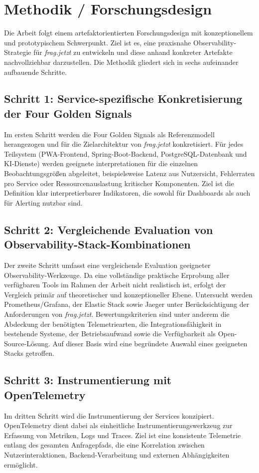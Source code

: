 \section{Methodik / Forschungsdesign}

Die Arbeit folgt einem artefaktorientierten Forschungsdesign mit konzeptionellem und prototypischem Schwerpunkt. Ziel ist es, eine praxisnahe Observability-Strategie für \emph{frag.jetzt} zu entwickeln und diese anhand konkreter Artefakte nachvollziehbar darzustellen. Die Methodik gliedert sich in sechs aufeinander aufbauende Schritte.

\subsection{Schritt 1: Service-spezifische Konkretisierung der Four Golden Signals}
Im ersten Schritt werden die Four Golden Signals als Referenzmodell herangezogen und für die Zielarchitektur von \emph{frag.jetzt} konkretisiert. Für jedes Teilsystem (PWA-Frontend, Spring-Boot-Backend, PostgreSQL-Datenbank und KI-Dienste) werden geeignete interpretationen für die einzelnen Beobachtungsgrößen abgeleitet, beispielsweise Latenz aus Nutzersicht, Fehlerraten pro Service oder Ressourcenauslastung kritischer Komponenten. Ziel ist die Definition klar interpretierbarer Indikatoren, die sowohl für Dashboards als auch für Alerting nutzbar sind.

\subsection{Schritt 2: Vergleichende Evaluation von Observability-Stack-Kombinationen}
Der zweite Schritt umfasst eine vergleichende Evaluation geeigneter Observability-Werkzeuge. Da eine vollständige praktische Erprobung aller verfügbaren Tools im Rahmen der Arbeit nicht realistisch ist, erfolgt der Vergleich primär auf theoretischer und konzeptioneller Ebene. Untersucht werden Prometheus/Grafana, der Elastic Stack sowie Jaeger unter Berücksichtigung der Anforderungen von \emph{frag.jetzt}. Bewertungskriterien sind unter anderem die Abdeckung der benötigten Telemetriearten, die Integrationsfähigkeit in bestehende Systeme, der Betriebsaufwand sowie die Verfügbarkeit als Open-Source-Lösung. Auf dieser Basis wird eine begründete Auswahl eines geeigneten Stacks getroffen.

\subsection{Schritt 3: Instrumentierung mit OpenTelemetry}
Im dritten Schritt wird die Instrumentierung der Services konzipiert. OpenTelemetry dient dabei als einheitliche Instrumentierungswerkzeug zur Erfassung von Metriken, Logs und Traces. Ziel ist eine konsistente Telemetrie entlang des gesamten Anfragepfads, die eine Korrelation zwischen Nutzerinteraktionen, Backend-Verarbeitung und externen Abhängigkeiten ermöglicht.

